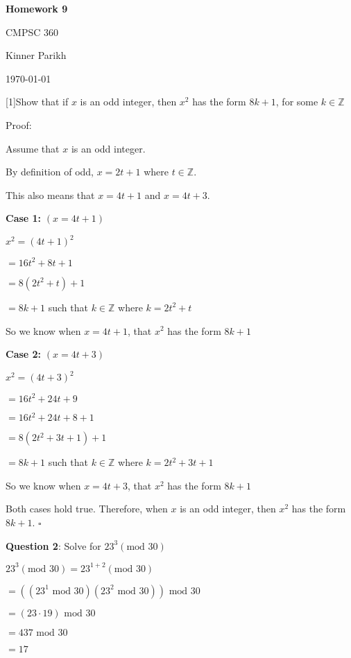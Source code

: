 \documentclass{article} %
\newcommand{\question}[2][]{\begin{flushleft}
        \textbf{Question #1}: #2

\end{flushleft}}
\newcommand{\maketitletwo}[2][]{\begin{center}
        \Large{\textbf{Homework #1}
            
            CMPSC 360} %
        \vspace{5pt}
        
        \normalsize{Kinner Parikh  %
        
        \today}        %
        \vspace{15pt}
        
\end{center}}
\begin{document}
    \maketitletwo[9]  %
    
    \question[1]{Show that if $x$ is an odd integer, then $x^2$ has the form $8k + 1$, for some $k \in \mathbb{Z}$}

    Proof:

    Assume that $x$ is an odd integer.

    By definition of odd, $x = 2t + 1$ where $t \in \mathbb{Z}$.

    This also means that $x = 4t + 1$ and $x = 4t + 3$.

    \textbf{Case 1:} $(x = 4t + 1)$
    
    \tabto{1cm} $x^2 = (4t + 1)^2$
         
    \tabto{1.45cm} $= 16t^2 + 8t + 1$

    \tabto{1.45cm} $= 8(2t^2 + t) + 1$

    \tabto{1.45cm} $= 8k + 1$ such that $k \in \mathbb{Z}$ where $k = 2t^2 + t$

    \tabto{1cm} So we know  when $x = 4t + 1$, that $x^2$ has the form $8k + 1$

    \textbf{Case 2:} $(x = 4t + 3)$

    \tabto{1cm} $x^2 = (4t + 3)^2$
         
    \tabto{1.45cm} $= 16t^2 + 24t + 9$
    
    \tabto{1.45cm} $= 16t^2 + 24t + 8 + 1$

    \tabto{1.45cm} $= 8(2t^2 + 3t + 1) + 1$

    \tabto{1.45cm} $= 8k + 1$ such that $k \in \mathbb{Z}$ where $k = 2t^2 + 3t + 1$
    
    \tabto{1cm} So we know when $x = 4t + 3$, that $x^2$ has the form $8k + 1$

    Both cases hold true. Therefore, when $x$ is an odd integer, then $x^2$ has the form $8k + 1$. $\square$

    \question[2]{Solve for $23 ^ 3 (\text{mod } 30)$}

    $23 ^ 3 (\text{mod } 30) = 23^{1 + 2} (\text{mod } 30)$

    \tabto{2.55cm} $= ((23^1 \text{ mod } 30)(23^2 \text{ mod } 30))\text{ mod } 30$

    \tabto{2.55cm} $= (23 \cdot 19) \text{ mod } 30$

    \tabto{2.55cm} $= 437 \text{ mod } 30$

    \tabto{2.55cm} $= 17$
\end{document}
